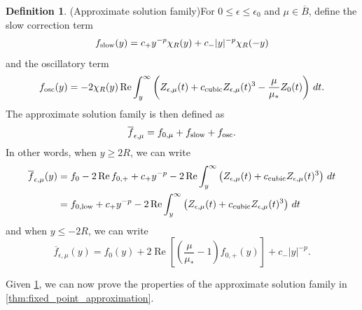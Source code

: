 \documentclass[11pt]{amsart}
\theoremstyle{definition}
\newtheorem{definition}[theorem]{Definition}
\theoremstyle{remark}
\numberwithin{equation}{section}
\newcommand{\ov}[1]{\overline{#1}}
\begin{document}
\begin{definition}(Approximate solution family)\label{def:approximate_solution_family}
For $0 \leq \epsilon \leq \epsilon_0$ and $\mu \in \ov{B}$,
define the slow correction term 
\begin{equation}\label{eqn:approx_slow_correction}
f_{\textup{slow}}(y) = c_{+}y^{-p}\chi_R(y) + c_{-}|y|^{-p}\chi_R(-y)
\end{equation}
and the oscillatory term 
\begin{equation}\label{eqn:approx_oscillatory_correction}
f_{\textup{osc}}(y) = -2 \chi_R(y)\operatorname{Re} \int_{y}^{\infty}\left(Z_{\epsilon, \mu}(t) + c_{\textup{cubic}}Z_{\epsilon, \mu}(t)^3 - \frac{\mu}{\mu_*}Z_0(t)\right) \, dt.
\end{equation}
The approximate solution family is then defined as
\begin{equation}\label{eqn:approx_family_definition}
    \ov{f}_{\epsilon, \mu} = f_{0, \mu} + f_{\textup{slow}} + f_{\textup{osc}}.
\end{equation}
In other words, when $y \geq 2R$, we can write
\begin{equation}\label{eqn:approx_family_positive}
\begin{aligned}
    \ov{f}_{\epsilon, \mu}(y) & = f_{0} - 2 \operatorname{Re}f_{0,+} + c_+y^{-p} - 2\operatorname{Re} \int_{y}^{\infty}\left(Z_{\epsilon, \mu}(t) + c_{\textup{cubic}}Z_{\epsilon, \mu}(t)^3\right) \, dt \\
    & = f_{0,\textup{low}} + c_+y^{-p} - 2\operatorname{Re} \int_{y}^{\infty}\left(Z_{\epsilon, \mu}(t) + c_{\textup{cubic}}Z_{\epsilon, \mu}(t)^3\right) \, dt
\end{aligned}
\end{equation}
and when $y \leq -2R$, we can write
\begin{equation}\label{eqn:approx_family_negative}
\ov{f}_{\epsilon, \mu}(y) = f_{0}(y) + 2\operatorname{Re}\left[\left(\frac{\mu}{\mu_*} - 1\right)f_{0,+}(y)\right] + c_-|y|^{-p}.
\end{equation}
\end{definition}

Given \cref{def:approximate_solution_family}, we can now prove the properties of the approximate solution family in \cref{thm:fixed_point_approximation}. 
\end{document}
